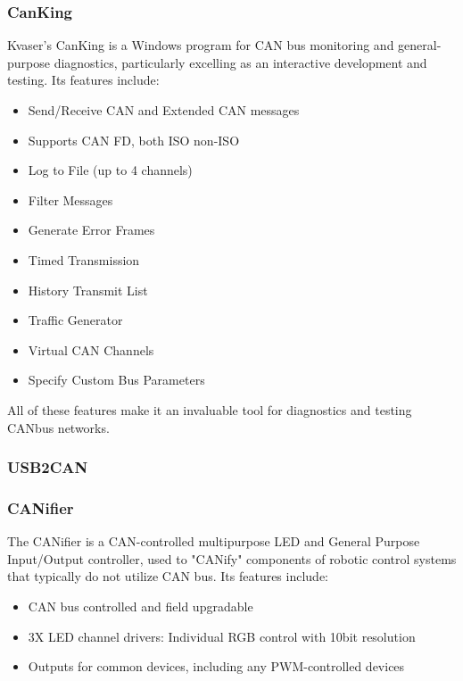 \documentclass[12pt]{article}
\begin{document}
\subsubsection{CanKing}
Kvaser's CanKing is a Windows program for CAN bus monitoring and general-purpose diagnostics, particularly excelling as an interactive development and testing. Its features include:

\begin{multicols}{2}
\begin{itemize}
    \item Send/Receive CAN and Extended CAN messages
    \item Supports CAN FD, both ISO non-ISO
    \item Log to File (up to 4 channels)
    \item Filter Messages
    \item Generate Error Frames
    \item Timed Transmission 
    \item History Transmit List
    \item Traffic Generator 
    \item Virtual CAN Channels 
    \item Specify Custom Bus Parameters 
\end{itemize}
\end{multicols}

All of these features make it an invaluable tool for diagnostics and testing CANbus networks.

\subsubsection{USB2CAN}

\subsubsection{CANifier}
The CANifier is a CAN-controlled multipurpose LED and General Purpose Input/Output controller, used to "CANify" components of robotic control systems that typically do not utilize CAN bus. Its features include:

\begin{itemize}
    \item CAN bus controlled and field upgradable
    \item 3X LED channel drivers: Individual RGB control with 10bit resolution
    \item Outputs for common devices, including any PWM-controlled devices
\end{itemize}
\end{document}
